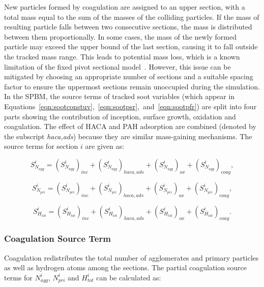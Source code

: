 New particles formed by coagulation are assigned to an upper section, with a total mass equal to the sum of the masses of the colliding particles. If the mass of resulting particle falls between two consecutive sections, the mass is distributed between them proportionally. In some cases, the mass of the newly formed particle may exceed the upper bound of the last section, causing it to fall outside the tracked mass range. This leads to potential mass loss, which is a known limitation of the fixed pivot sectional model~\citep{zhang2010detailed}. However, this issue can be mitigated by choosing an appropriate number of sections and a suitable spacing factor to ensure the uppermost sections remain unoccupied during the simulation. In the SPBM, the source terms of tracked soot variables (which appear in Equations~\ref{eqn:sootconstuv},~\ref{eqn:sootpsr},~and~\ref{eqn:sootpfr}) are split into four parts showing the contribution of inception, surface growth, oxidation and coagulation. The effect of HACA and PAH adsorption are combined (denoted by the subscript \textit{haca,ads}) because they are similar mass-gaining mechanisms. The source terms for section $i$ are given as:

\begin{equation}
	S^i_{N_{agg}} = 
	\left(S^i_{N_{agg}}\right)_{inc}
	+\left(S^i_{N_{agg}}\right)_{haca, ads}
	+\left(S^i_{N_{agg}}\right)_{ox}
	+\left(S^i_{N_{agg}}\right)_{coag}
	\label{eqn:S_Naggsect},
\end{equation}

\begin{equation}
	S^i_{N_{pri}} = 
	\left(S^i_{N_{pri}}\right)_{inc}
	+\left(S^i_{N_{pri}}\right)_{haca, ads}
	+\left(S^i_{N_{pri}}\right)_{ox}
	+\left(S^i_{N_{pri}}\right)_{coag}
	\label{eqn:S_Nprisect},
\end{equation}

\begin{equation}
	S^i_{H_{tot}} = 
	\left(S^i_{H_{tot}}\right)_{inc}
	+\left(S^i_{H_{tot}}\right)_{haca, ads}
	+\left(S^i_{H_{tot}}\right)_{ox}
	+\left(S^i_{H_{tot}}\right)_{coag}
	\label{eqn:S_Htotsect}.
\end{equation}
 
\subsubsection{Coagulation Source Term}
\label{sec:sectcoagsource}
Coagulation redistributes the total number of agglomerates and primary particles as well as hydrogen atoms among the sections. The partial coagulation source terms for ${N^i_{agg}}$, ${N^i_{pri}}$ and ${H^i_{tot}}$ can be calculated as:

